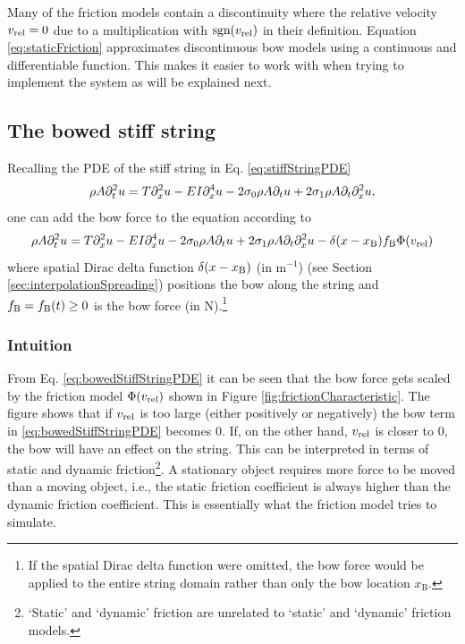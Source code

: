 Many of the friction models contain a discontinuity where the relative velocity $v_\text{rel} = 0$ due to a multiplication with $\text{sgn}(v_\text{rel})$ in their definition. Equation \eqref{eq:staticFriction} approximates discontinuous bow models using a continuous and differentiable function. This makes it easier to work with when trying to implement the system as will be explained next.

\subsection{The bowed stiff string}\label{sec:bowedStiffStringStatic}
Recalling the PDE of the stiff string in Eq. \eqref{eq:stiffStringPDE}
\begin{equation}
    \rho A \partial_t^2 u = T \partial_x^2 u - EI \partial_x^4 u - 2 \sigma_{0} \rho A \partial_t u + 2 \sigma_{1} \rho A\partial_t \partial_x^2 u,
\end{equation}
one can add the bow force to the equation according to 
\begin{equation}\label{eq:bowedStiffStringPDE}
    \rho A \partial_t^2 u = T \partial_x^2 u - EI \partial_x^4 u - 2 \sigma_{0} \rho A \partial_t u + 2 \sigma_{1} \rho A\partial_t \partial_x^2 u - \delta(x-x_{\text{B}})f_{\text{B}}\Phi(v_\text{rel})
\end{equation}
where spatial Dirac delta function $\delta(x-x_{\text{B}})$ (in m$^{-1}$) (see Section \ref{sec:interpolationSpreading}) positions the bow along the string and $f_{\text{B}} = f_{\text{B}}(t) \geq 0$ is the bow force (in N).\footnote{If the spatial Dirac delta function were omitted, the bow force would be applied to the entire string domain rather than only the bow location $x_\text{B}$.} 

\subsubsection{Intuition}
From Eq. \eqref{eq:bowedStiffStringPDE} it can be seen that the bow force gets scaled by the friction model $\Phi(v_\text{rel})$ shown in Figure \ref{fig:frictionCharacteristic}. 
The figure shows that if $v_\text{rel}$ is too large (either positively or negatively) the bow term in \eqref{eq:bowedStiffStringPDE} becomes $0$. If, on the other hand, $v_\text{rel}$ is closer to $0$, the bow will have an effect on the string. This can be interpreted in terms of static and dynamic friction\footnote{`Static' and `dynamic' friction are unrelated to `static' and `dynamic' friction models.}. A stationary object requires more force to be moved than a moving object, i.e., the static friction coefficient is always higher than the dynamic friction coefficient. This is essentially what the friction model tries to simulate.

